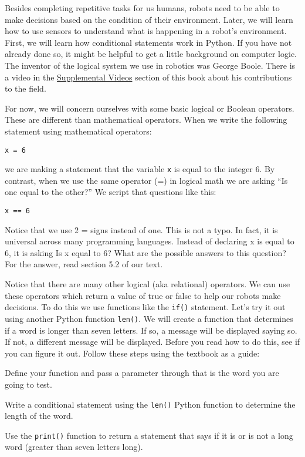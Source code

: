 \documentclass[
]{book}
\begin{document}
Besides completing repetitive tasks for us humans, robots need to be able to make decisions based on the condition of their environment. Later, we will learn how to use sensors to understand what is happening in a robot's environment. First, we will learn how conditional statements work in Python. If you have not already done so, it might be helpful to get a little background on computer logic. The inventor of the logical system we use in robotics was George Boole. There is a video in the \protect\hyperlink{supplemental-videos}{Supplemental Videos} section of this book about his contributions to the field.

For now, we will concern ourselves with some basic logical or Boolean operators. These are different than mathematical operators. When we write the following statement using mathematical operators:

\texttt{x\ =\ 6}

we are making a statement that the variable \texttt{x} is equal to the integer 6. By contrast, when we use the same operator (=) in logical math we are asking ``Is one equal to the other?'' We script that questions like this:

\texttt{x\ ==\ 6}

Notice that we use 2 = signs instead of one. This is not a typo. In fact, it is universal across many programming languages. Instead of declaring x is equal to 6, it is asking Is x equal to 6? What are the possible answers to this question? For the answer, read section 5.2 of our text.

Notice that there are many other logical (aka relational) operators. We can use these operators which return a value of true or false to help our robots make decisions. To do this we use functions like the \texttt{if()} statement. Let's try it out using another Python function \texttt{len()}. We will create a function that determines if a word is longer than seven letters. If so, a message will be displayed saying so. If not, a different message will be displayed. Before you read how to do this, see if you can figure it out. Follow these steps using the textbook as a guide:

Define your function and pass a parameter through that is the word you are going to test.

Write a conditional statement using the \texttt{len()} Python function to determine the length of the word.

Use the \texttt{print()} function to return a statement that says if it is or is not a long word (greater than seven letters long).
\end{document}
